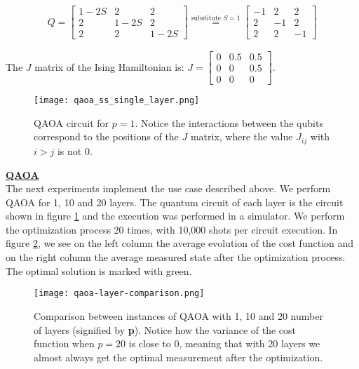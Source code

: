 \documentclass[12pt,a4paper]{report}
\begin{document}
\begin{align*}
Q = \begin{bmatrix}
1 - 2S & 2 & 2 \\
2 & 1-2S & 2 \\
2 & 2 & 1-2S
\end{bmatrix}
\overset{\text{substitute } S = 1}{=} 
\begin{bmatrix}
-1 & 2 & 2 \\
2 & -1 & 2 \\
2 & 2 & -1
\end{bmatrix}
\end{align*}

\noindent
The \( J \) matrix of the Ising Hamiltonian is: 
\( J = \begin{bmatrix} 
0 & 0.5 & 0.5 \\
0 & 0 & 0.5 \\
0 & 0 & 0 
\end{bmatrix} \).


\begin{figure}[!h]
    \centering
    \texttt{[image: qaoa\_ss\_single\_layer.png]}
    \caption{QAOA circuit for \(p=1\). Notice the interactions between the qubits correspond to the positions of the \(J\) matrix, where the value \(J_{ij}\) with \(i>j\) is not 0.}
    \label{fig:qaoa_p_1_circuit}
\end{figure}

\newpage

\noindent
\textbf{\underline{QAOA}}
\\

\noindent
The next experiments implement the use case described above. We perform QAOA for 1, 10 and 20 layers. The quantum circuit of each layer is the circuit shown in figure \ref{fig:qaoa_p_1_circuit} and the execution was performed in a simulator. We perform the optimization process 20 times, with 10,000 shots per circuit execution. In figure \ref{fig:qaoa-layer-comparison}, we see on the left column the average evolution of the cost function and on the right column the average measured state after the optimization process. The optimal solution is marked with green.


\begin{figure}[H]
    \centering
    \texttt{[image: qaoa-layer-comparison.png]}
    \caption{Comparison between instances of QAOA with 1, 10 and 20 number of layers (signified by \textbf{p}). Notice how the variance of the cost function when \(p=20\) is close to 0, meaning that with 20 layers we almost always get the optimal measurement after the optimization.}
    \label{fig:qaoa-layer-comparison}
\end{figure}
\end{document}
